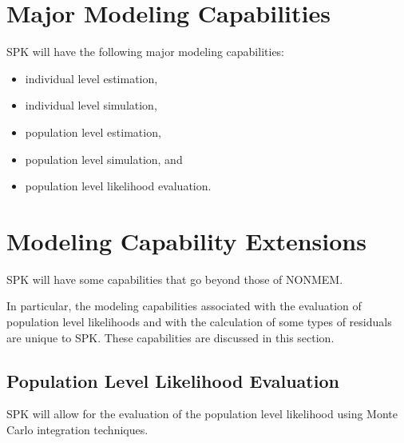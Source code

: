 \documentclass{article}
\begin{document}
%
\section{Major Modeling Capabilities}
%

SPK will have the following major modeling capabilities:
\begin{itemize}
  \item individual level estimation,
  \item individual level simulation,
  \item population level estimation,
  \item population level simulation, and
  \item population level likelihood evaluation.
\end{itemize}


%
\section{Modeling Capability Extensions}
%

SPK will have some capabilities that go beyond those of NONMEM.

In particular, the modeling capabilities associated with the 
evaluation of population level likelihoods and with the 
calculation of some types of residuals are unique to SPK.
These capabilities are discussed in this section.


\subsection{Population Level Likelihood Evaluation}

SPK will allow for the evaluation of the population level likelihood
using Monte Carlo integration techniques.

%
%


\end{document}
